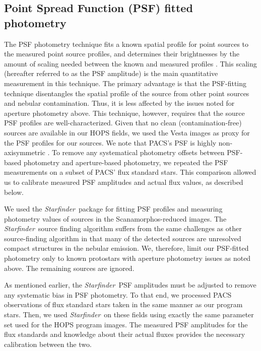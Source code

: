 \documentclass[manuscript]{aastex61}
\newcommand{\starfinder}{{\em Starfinder}}
\begin{document}
\subsection{Point Spread Function (PSF) fitted photometry}
\par
The PSF photometry technique fits a known spatial profile for point sources to the measured point source profiles, and determines their brightnesses by the amount of scaling needed between the known and measured profiles \citep{psfphotometry}.   This scaling (hereafter referred to as the PSF amplitude) is the main quantitative measurement in this technique.  The primary advantage is that the PSF-fitting technique disentangles the spatial profile of the source from other point sources and nebular contamination.  Thus, it is less affected by the issues noted for aperture photometry above.  This technique, however, requires that the source PSF profiles are well-characterized.  Given that no clean (contamination-free) sources are available in our HOPS fields, we used the Vesta images \citep{psfpaper} as proxy for the PSF profiles for our sources.  We note that PACS's PSF is highly non-axisymmetric \citep{psfpaper}.  To remove any systematical photometry offsets between PSF-based photometry and aperture-based photometry, we repeated the PSF measurements on a subset of PACS' flux standard stars.  This comparison allowed us to calibrate measured PSF amplitudes and actual flux values, as described below.
\par
We used the \starfinder\ package \citep{starfinder} for fitting PSF profiles  and measuring photometry values of sources in the Scanamorphos-reduced images.  The \starfinder\ source finding algorithm suffers from the same challenges as other source-finding algorithm in that many of the detected sources are unresolved compact structures in the nebular emission.  We, therefore, limit our PSF-fitted photometry only to known protostars with aperture photometry issues as noted above.  The remaining sources are ignored.
\par
As mentioned earlier, the \starfinder\ PSF amplitudes must be adjusted to remove any systematic bias in PSF photometry.  To that end, we processed PACS observations of flux standard stars taken in the same manner as our program stars.  Then, we used \starfinder\ on these fields using exactly the same parameter set used for the HOPS program images.  The measured PSF amplitudes for the flux standards and knowledge about their actual fluxes provides the necessary calibration between the two.
\end{document}
